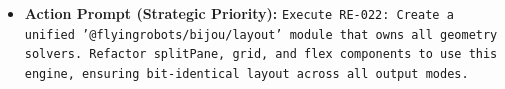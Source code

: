 \begin{itemize}
  \begin{itemize}
  \tightlist
  \item
    \textbf{Action Prompt (Strategic Priority):} \texttt{E\allowbreak{}x\allowbreak{}e\allowbreak{}c\allowbreak{}u\allowbreak{}t\allowbreak{}e\allowbreak{} \allowbreak{}R\allowbreak{}E\allowbreak{}-\allowbreak{}0\allowbreak{}2\allowbreak{}2\allowbreak{}:\allowbreak{} \allowbreak{}C\allowbreak{}r\allowbreak{}e\allowbreak{}a\allowbreak{}t\allowbreak{}e\allowbreak{} \allowbreak{}a\allowbreak{} \allowbreak{}u\allowbreak{}n\allowbreak{}i\allowbreak{}f\allowbreak{}i\allowbreak{}e\allowbreak{}d\allowbreak{} \allowbreak{}'\allowbreak{}@\allowbreak{}f\allowbreak{}l\allowbreak{}y\allowbreak{}i\allowbreak{}n\allowbreak{}g\allowbreak{}r\allowbreak{}o\allowbreak{}b\allowbreak{}o\allowbreak{}t\allowbreak{}s\allowbreak{}/\allowbreak{}b\allowbreak{}i\allowbreak{}j\allowbreak{}o\allowbreak{}u\allowbreak{}/\allowbreak{}l\allowbreak{}a\allowbreak{}y\allowbreak{}o\allowbreak{}u\allowbreak{}t\allowbreak{}'\allowbreak{} \allowbreak{}m\allowbreak{}o\allowbreak{}d\allowbreak{}u\allowbreak{}l\allowbreak{}e\allowbreak{} \allowbreak{}t\allowbreak{}h\allowbreak{}a\allowbreak{}t\allowbreak{} \allowbreak{}o\allowbreak{}w\allowbreak{}n\allowbreak{}s\allowbreak{} \allowbreak{}a\allowbreak{}l\allowbreak{}l\allowbreak{} \allowbreak{}g\allowbreak{}e\allowbreak{}o\allowbreak{}m\allowbreak{}e\allowbreak{}t\allowbreak{}r\allowbreak{}y\allowbreak{} \allowbreak{}s\allowbreak{}o\allowbreak{}l\allowbreak{}v\allowbreak{}e\allowbreak{}r\allowbreak{}s\allowbreak{}.\allowbreak{} \allowbreak{}R\allowbreak{}e\allowbreak{}f\allowbreak{}a\allowbreak{}c\allowbreak{}t\allowbreak{}o\allowbreak{}r\allowbreak{} \allowbreak{}s\allowbreak{}p\allowbreak{}l\allowbreak{}i\allowbreak{}t\allowbreak{}P\allowbreak{}a\allowbreak{}n\allowbreak{}e\allowbreak{},\allowbreak{} \allowbreak{}g\allowbreak{}r\allowbreak{}i\allowbreak{}d\allowbreak{},\allowbreak{} \allowbreak{}a\allowbreak{}n\allowbreak{}d\allowbreak{} \allowbreak{}f\allowbreak{}l\allowbreak{}e\allowbreak{}x\allowbreak{} \allowbreak{}c\allowbreak{}o\allowbreak{}m\allowbreak{}p\allowbreak{}o\allowbreak{}n\allowbreak{}e\allowbreak{}n\allowbreak{}t\allowbreak{}s\allowbreak{} \allowbreak{}t\allowbreak{}o\allowbreak{} \allowbreak{}u\allowbreak{}s\allowbreak{}e\allowbreak{} \allowbreak{}t\allowbreak{}h\allowbreak{}i\allowbreak{}s\allowbreak{} \allowbreak{}e\allowbreak{}n\allowbreak{}g\allowbreak{}i\allowbreak{}n\allowbreak{}e\allowbreak{},\allowbreak{} \allowbreak{}e\allowbreak{}n\allowbreak{}s\allowbreak{}u\allowbreak{}r\allowbreak{}i\allowbreak{}n\allowbreak{}g\allowbreak{} \allowbreak{}b\allowbreak{}i\allowbreak{}t\allowbreak{}-\allowbreak{}i\allowbreak{}d\allowbreak{}e\allowbreak{}n\allowbreak{}t\allowbreak{}i\allowbreak{}c\allowbreak{}a\allowbreak{}l\allowbreak{} \allowbreak{}l\allowbreak{}a\allowbreak{}y\allowbreak{}o\allowbreak{}u\allowbreak{}t\allowbreak{} \allowbreak{}a\allowbreak{}c\allowbreak{}r\allowbreak{}o\allowbreak{}s\allowbreak{}s\allowbreak{} \allowbreak{}a\allowbreak{}l\allowbreak{}l\allowbreak{} \allowbreak{}o\allowbreak{}u\allowbreak{}t\allowbreak{}p\allowbreak{}u\allowbreak{}t\allowbreak{} \allowbreak{}m\allowbreak{}o\allowbreak{}d\allowbreak{}e\allowbreak{}s\allowbreak{}.}

\end{itemize}
\end{itemize}
